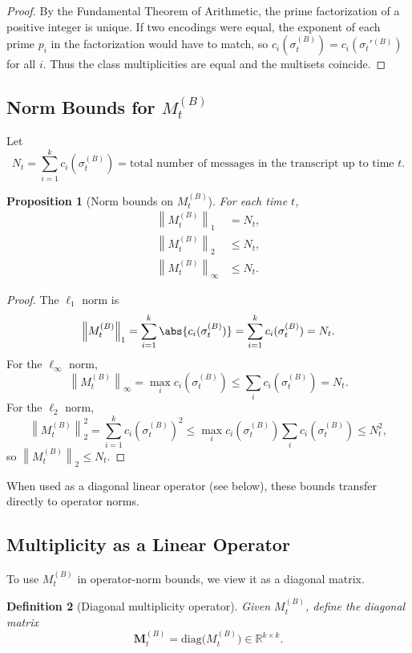 \documentclass[11pt]{article}
\newtheorem{definition}{Definition}[section]
\newtheorem{proposition}[definition]{Proposition}
\newcommand{\R}{\mathbb{R}}
\newcommand{\norm}[1]{\left\lVert #1 \right\rVert}
\begin{document}
\begin{proof}
By the Fundamental Theorem of Arithmetic, the prime factorization of a positive integer is unique.
If two encodings were equal, the exponent of each prime \(p_i\) in the factorization would have to match, so \(c_i(\sigma_t^{(B)}) = c_i(\sigma_t'{}^{(B)})\) for all \(i\).
Thus the class multiplicities are equal and the multisets coincide.
\end{proof}

\subsection{Norm Bounds for \texorpdfstring{$M_t^{(B)}$}{M\_t\^B}}

Let
\[
  N_t = \sum_{i=1}^k c_i(\sigma_t^{(B)}) = \text{total number of messages in the transcript up to time } t.
\]

\begin{proposition}[Norm bounds on \(M_t^{(B)}\)]
For each time \(t\),
\begin{align*}
  \norm{M_t^{(B)}}_1 &= N_t, \\
  \norm{M_t^{(B)}}_2 &\le N_t, \\
  \norm{M_t^{(B)}}_\infty &\le N_t.
\end{align*}
\end{proposition}

\begin{proof}
The \(\ell_1\) norm is
\[
  \norm{M_t^{(B)}}_1 = \sum_{i=1}^k \abs{c_i(\sigma_t^{(B)})} = \sum_{i=1}^k c_i(\sigma_t^{(B)}) = N_t.
\]
For the \(\ell_\infty\) norm,
\[
  \norm{M_t^{(B)}}_\infty = \max_i c_i(\sigma_t^{(B)}) \le \sum_i c_i(\sigma_t^{(B)}) = N_t.
\]
For the \(\ell_2\) norm,
\[
  \norm{M_t^{(B)}}_2^2 = \sum_{i=1}^k c_i(\sigma_t^{(B)})^2 \le \max_i c_i(\sigma_t^{(B)}) \sum_i c_i(\sigma_t^{(B)}) \le N_t^2,
\]
so \(\norm{M_t^{(B)}}_2 \le N_t\).
\end{proof}

When used as a diagonal linear operator (see below), these bounds transfer directly to operator norms.

\subsection{Multiplicity as a Linear Operator}

To use \(M_t^{(B)}\) in operator-norm bounds, we view it as a diagonal matrix.

\begin{definition}[Diagonal multiplicity operator]
Given \(M_t^{(B)}\), define the diagonal matrix
\[
  \mathbf{M}_t^{(B)} = \mathrm{diag}\bigl(M_t^{(B)}\bigr) \in \R^{k \times k}.
\]
\end{definition}
\end{document}
